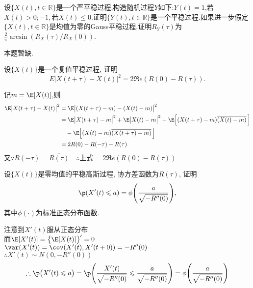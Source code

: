 \begin{problem}{4.9}
设$\{X(t),t\in \mathbb{R}\}$是一个严平稳过程,构造随机过程$Y$如下:$Y(t)=1$,若$X(t)>0;-1,$若$X(t)\leq 0$.证明$\{Y(t),t\in \mathbb{R}\}$是一个平稳过程.如果进一步假定$\{X(t),t\in \mathbb{R}\}$是均值为零的Gauss平稳过程,证明$R_Y(\tau)$为$\frac{2}{\uppi}\arcsin (R_X(\tau)/R_X(0))$.
\end{problem}
\begin{solution}
	本题暂缺.
\end{solution}

\begin{problem}{4.10}
设$\{X(t)\}$是一个复值平稳过程, 证明
\[E|X(t+\tau)-X(t)|^2 = 2\Re e(R(0)-R(\tau)).\]
\end{problem}
\begin{solution}
	记$m=\E[X(t)]$,则
	\[
		\begin{split}
			\E\big|X(t+\tau) - X(t)\big|^2 & = \E\big|(X(t+\tau)-m)-(X(t)-m)\big|^2\\
			& = \E\big|X(t+\tau)-m\big|^2 + \E\big|X(t)-m\big|^2 - \E\Big[(X(t+\tau)-m)\overline{(X(t)-m)}\,\Big] \\
			& \quad - \E\Big[(X(t)-m)\overline{(X(t+\tau)-m)}\,\Big]\\
			& = 2R(0)-R(-\tau)-R(\tau)
		\end{split}
	\]
	又$\because R(-\tau) = \overline{R(\tau)}\quad \therefore \text{上式} = 2\Re e(R(0)-R(\tau))$
\end{solution}

\begin{problem}{4.11}
设$\{X(t)\}$是零均值的平稳高斯过程, 协方差函数为$R(\tau)$, 证明
\[\p(X'(t) \leqslant a) = \phi\Bigg(\frac{a}{\sqrt{-R''(0)}}\Bigg),\]
其中$\phi(\cdot)$为标准正态分布函数.
\end{problem}
\begin{solution}
	注意到$X'(t)$服从正态分布\\
	而$\E[X'(t)] = \big\{\E[X(t)]\big\}' = 0$\\
	$\var(X'(t)) = \cov(X'(t), X'(t+0)) = -R''(0)$\\
	$\therefore X'(t) \sim N(0,-R''(0))$\\
	\[\therefore \p\big(X'(t) \leqslant a\big) = \p\Bigg(\frac{X'(t)}{\sqrt{-R''(0)}} \leqslant \frac{a}{\sqrt{-R''(0)}}\Bigg) = \phi\Bigg(\frac{a}{\sqrt{-R''(0)}}\Bigg)\]
\end{solution}

